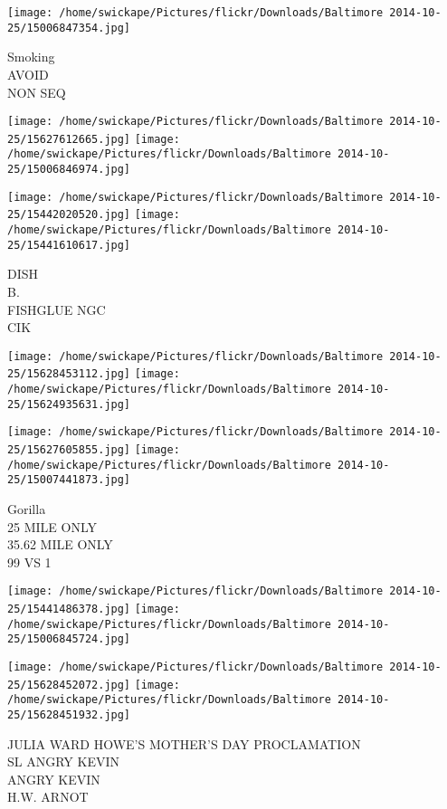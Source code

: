 \documentclass[10pt,letterpaper]{article}
\begin{document}
\vspace{0.25in}
\texttt{[image: /home/swickape/Pictures/flickr/Downloads/Baltimore 2014-10-25/15006847354.jpg]}

Smoking\\
AVOID\\
NON SEQ
\pagebreak

\texttt{[image: /home/swickape/Pictures/flickr/Downloads/Baltimore 2014-10-25/15627612665.jpg]}
\texttt{[image: /home/swickape/Pictures/flickr/Downloads/Baltimore 2014-10-25/15006846974.jpg]}

\texttt{[image: /home/swickape/Pictures/flickr/Downloads/Baltimore 2014-10-25/15442020520.jpg]}
\texttt{[image: /home/swickape/Pictures/flickr/Downloads/Baltimore 2014-10-25/15441610617.jpg]}

DISH\\
B.\\
FISHGLUE NGC\\
CIK
\pagebreak

\texttt{[image: /home/swickape/Pictures/flickr/Downloads/Baltimore 2014-10-25/15628453112.jpg]}
\texttt{[image: /home/swickape/Pictures/flickr/Downloads/Baltimore 2014-10-25/15624935631.jpg]}

\texttt{[image: /home/swickape/Pictures/flickr/Downloads/Baltimore 2014-10-25/15627605855.jpg]}
\texttt{[image: /home/swickape/Pictures/flickr/Downloads/Baltimore 2014-10-25/15007441873.jpg]}

Gorilla\\
25 MILE ONLY\\
35.62 MILE ONLY\\
99 VS 1
\pagebreak

\texttt{[image: /home/swickape/Pictures/flickr/Downloads/Baltimore 2014-10-25/15441486378.jpg]}
\texttt{[image: /home/swickape/Pictures/flickr/Downloads/Baltimore 2014-10-25/15006845724.jpg]}

\texttt{[image: /home/swickape/Pictures/flickr/Downloads/Baltimore 2014-10-25/15628452072.jpg]}
\texttt{[image: /home/swickape/Pictures/flickr/Downloads/Baltimore 2014-10-25/15628451932.jpg]}

JULIA WARD HOWE'S MOTHER'S DAY PROCLAMATION\\
SL ANGRY KEVIN\\
ANGRY KEVIN\\
H.W. ARNOT
\pagebreak
\end{document}
